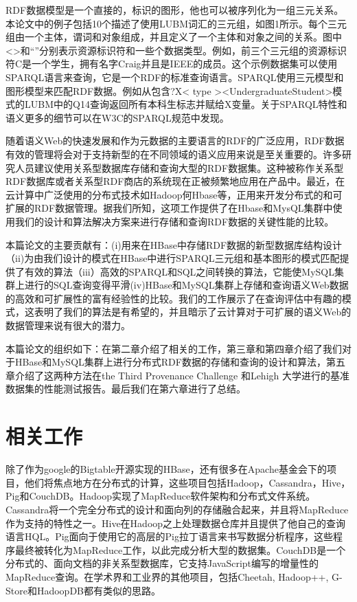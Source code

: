  RDF数据模型是一个直接的，标识的图形，他也可以被序列化为一组三元关系。本论文中的例子包括10个描述了使用LUBM词汇的三元组，如图1所示。每个三元组由一个主体，谓词和对象组成，并且定义了一个主体和对象之间的关系。图中<>和“”分别表示资源标识符和一些个数据类型。例如，前三个三元组的资源标识符C是一个学生，拥有名字Craig并且是IEEE的成员。这个示例数据集可以使用SPARQL语言来查询，它是一个RDF的标准查询语言。SPARQL使用三元模型和图形模型来匹配RDF数据。例如从包含?X< type ><UndergraduateStudent>模式的LUBM中的Q14查询返回所有本科生标志并赋给X变量。关于SPARQL特性和语义更多的细节可以在W3C的SPARQL规范中发现。

  随着语义Web的快速发展和作为元数据的主要语言的RDF的广泛应用，RDF数据有效的管理将会对于支持新型的在不同领域的语义应用来说是至关重要的。许多研究人员建议使用关系型数据库存储和查询大型的RDF数据集。这种被称作关系型RDF数据库或者关系型RDF商店的系统现在正被频繁地应用在产品中。最近，在云计算中广泛使用的分布式技术如Hadoop何Hbase等，正用来开发分布式的和可扩展的RDF数据管理。据我们所知，这项工作提供了在Hbase和MysQL集群中使用我们的设计和算法解决方案来进行存储和查询RDF数据的关键性能的比较。

  本篇论文的主要贡献有：(i)用来在HBase中存储RDF数据的新型数据库结构设计（ii)为由我们设计的模式在HBase中进行SPARQL三元组和基本图形的模式匹配提供了有效的算法（iii）高效的SPARQL和SQL之间转换的算法，它能使MySQL集群上进行的SQL查询变得平滑(iv)HBase和MySQL集群上存储和查询语义Web数据的高效和可扩展性的富有经验性的比较。我们的工作展示了在查询评估中有趣的模式，这表明了我们的算法是有希望的，并且暗示了云计算对于可扩展的语义Web的数据管理来说有很大的潜力。

  本篇论文的组织如下：在第二章介绍了相关的工作，第三章和第四章介绍了我们对于HBase和MySQL集群上进行分布式RDF数据的存储和查询的设计和算法，第五章介绍了这两种方法在the Third Provenance Challenge 和Lehigh 大学进行的基准数据集的性能测试报告。最后我们在第六章进行了总结。


\section*{相关工作}
  除了作为google的Bigtable开源实现的HBase，还有很多在Apache基金会下的项目，他们将焦点地方在分布式的计算，这些项目包括Hadoop，Cassandra，Hive，Pig和CouchDB。Hadoop实现了MapReduce软件架构和分布式文件系统。Cassandra将一个完全分布式的设计和面向列的存储融合起来，并且将MapReduce作为支持的特性之一。Hive在Hadoop之上处理数据仓库并且提供了他自己的查询语言HQL。Pig面向于使用它的高层的Pig拉丁语言来书写数据分析程序，这些程序最终被转化为MapReduce工作，以此完成分析大型的数据集。CouchDB是一个分布式的、面向文档的非关系型数据库，它支持JavaScript编写的增量性的MapReduce查询。在学术界和工业界的其他项目，包括Cheetah, Hadoop++, G-Store和HadoopDB都有类似的思路。

